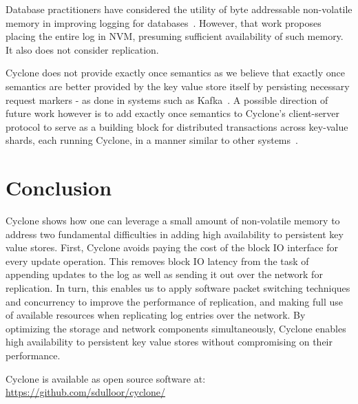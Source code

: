 \documentclass[letterpaper,twocolumn,10pt]{article}
\begin{document}

Database practitioners have considered the utility of byte addressable
non-volatile memory in improving logging for
databases~\cite{nvram_log}. However, that work proposes placing the entire log
in NVM, presuming sufficient availability of such memory. It also does not
consider replication.

Cyclone does not provide exactly once semantics as we
believe that exactly once semantics are better provided by the key value store
itself by persisting necessary request markers - as done in systems such as
Kafka~\cite{kafka}. A possible direction of future work however is to add
exactly once semantics to Cyclone's client-server protocol to serve as a
building block for distributed transactions across key-value shards, each
running Cyclone, in a manner similar to other systems~\cite{raft_lin}.

\section{Conclusion}
Cyclone shows how one can leverage a small amount of non-volatile memory to
address two fundamental difficulties in adding high availability to persistent
key value stores. First, Cyclone avoids
paying the cost of the block IO interface for every update operation. This
removes block IO latency from the task of appending updates to the log as well
as sending it out over the network for replication. In turn, this enables us to
apply software packet switching techniques and concurrency to improve the
performance of replication, and making full use of available resources when
replicating log entries over the network. By optimizing the storage and network
components simultaneously, Cyclone enables high availability to persistent key
value stores without compromising on their performance.

Cyclone is available as open source software at:\\
\url{https://github.com/sdulloor/cyclone/}
\newcommand\myurl[2]{\url{#1}}


\end{document}
